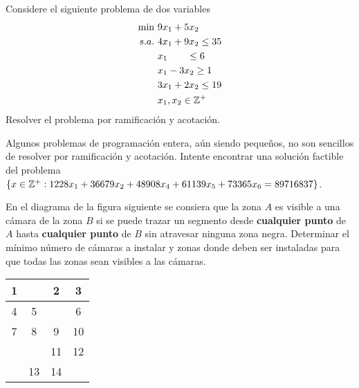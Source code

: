 \documentclass[twoside]{article}
\begin{document}
\newpage

\begin{ejercicio}{8}
Considere el siguiente problema de dos variables
\begin{align*}
\min\ & 9x_1+5x_2\\
s.a.\   & 4x_1+9x_2\leq 35\\
       & x_1\qquad\leq 6\\
       & x_1-3x_2\geq 1\\
       & 3x_1+2x_2\leq 19\\
       & x_1,x_2\in\mathbb{Z}^+
\end{align*}
Resolver el problema por ramificación y acotación.
\end{ejercicio}
\begin{solucion}
\end{solucion}

\newpage

\begin{ejercicio}{9}
Algunos problemas de programación entera, aún siendo pequeños, no son sencillos de resolver por ramificación y acotación. Intente encontrar una solución factible del problema $\{x\in\mathbb{Z}^+: 1228x_1+36679x_2+48908x_4+61139x_5+73365x_6=89716837\}$.
\end{ejercicio}
\begin{solucion}
\end{solucion}

\newpage

\begin{ejercicio}{10}
En el diagrama de la figura siguiente se consiera que la zona $A$ es visible a una cámara de la zona $B$ si se puede trazar un segmento desde \textbf{cualquier punto} de $A$ hasta \textbf{cualquier punto} de $B$ sin atravesar ninguna zona negra. Determinar el mínimo número de cámaras a instalar y zonas donde deben ser instaladas para que todas las zonas sean visibles a las cámaras.

\begin{center}
\begin{tabular}{|c|c|c|c|}
\hline
1 & \cellcolor{black} & 2 & 3\\
\hline
4 & 5 & \cellcolor{black} & 6\\
\hline
7 & 8 & 9 & 10\\
\hline
\cellcolor{black} & \cellcolor{black}& 11 & 12\\
 \hline
 \cellcolor{black}& 13 & 14 & \cellcolor{black} \\
 \hline
\end{tabular}
\end{center}
\end{ejercicio}
\begin{solucion}
\end{solucion}
\end{document}
